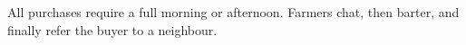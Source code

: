 \documentclass[a4paper,openany]{book}
\newcommand\baileydesc{}
\newcommand\baileymarkets{%
  \baileyServices\par%
  \baileyHospitality\par%
  \baileySalvage\par%
  \baileyWeaver\par%
}
\newcommand\baileymarketsWide{}
\newcommand\baileyback{}
\edef\baileyname{\expandafter\MakeUppercase\name}
\begin{document}
\frontmatter

\pagestyle{empty}

\section*{\baileyname}

\baileydesc

All purchases require a full morning or afternoon.
Farmers chat, then barter, and finally refer the buyer to a neighbour.

\begin{multicols}{3}

\baileymarkets

\end{multicols}

\begin{multicols*}{2}

\baileymarketsWide

\end{multicols*}


\clearpage

\begin{multicols}{2}

\baileyback

\end{multicols}
\end{document}
